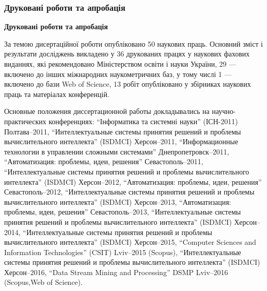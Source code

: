 \documentclass[14pt,handout,utf8]{beamer}
\newcommand{\Xhead}[1]{
 \begin{center}%
      \textbf{#1}%
 \end{center}%
}
\begin{document}
\begin{frame}
  \frametitle{Друковані роботи та апробація}

  \Xhead{Друковані роботи та апробація}

За темою дисертаційної роботи опубліковано
50 наукових праць. Основний зміст і результати досліджень
викладено у 36 друкованих працях у наукових фахових виданнях, які
рекомендовано Міністерством освіти і науки України,
29 --- включено до інших міжнародних наукометричних баз,
у тому числі 1 --- включено до бази Web of Science,
13 робіт опубліковано у збірниках наукових праць та матеріалах конференцій.

\smallskip

Основные положения диссертационной работы докладывались на
научно-практических конференциях:
``Інформатика та системні науки'' (ІСН-2011) Полтава--2011,
``Интеллектуальные системы принятия решений и проблемы вычислительного интеллекта'' (ISDMCI) Херсон--2011,
``Информационные технологии в управлении сложными системами'' Днепропетровск--2011,
``Автоматизация: проблемы, идеи, решения'' Севастополь--2011,
``Интеллектуальные системы принятия решений и проблемы вычислительного интеллекта'' (ISDMCI) Херсон--2012,
``Автоматизация: проблемы, идеи, решения'' Севастополь--2012,
``Интеллектуальные системы принятия решений и проблемы вычислительного интеллекта'' (ISDMCI) Херсон--2013,
``Автоматизация: проблемы, идеи, решения'' Севастополь--2013,
``Интеллектуальные системы принятия решений и проблемы вычислительного интеллекта'' (ISDMCI) Херсон--2014,
``Интеллектуальные системы принятия решений и проблемы вычислительного интеллекта'' (ISDMCI) Херсон--2015,
``Computer Sciences and Information Technologies'' (CSIT) Lviv--2015 (Scopus),
``Интеллектуальные системы принятия решений и проблемы вычислительного интеллекта'' (ISDMCI) Херсон--2016,
``Data Stream Mining and Processing'' DSMP Lviv--2016 (Scopus,Web of Science).

\end{frame}




\end{document}
